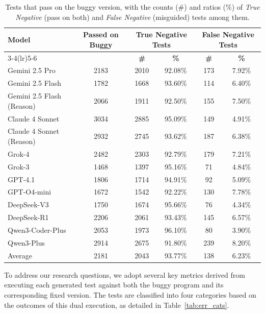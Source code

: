 \documentclass[acmsmall]{acmart}
\begin{document}
\begin{table}[ht]
\vspace{-0.4em}
\centering
\scriptsize
\caption{Tests that pass on the buggy version, with the counts (\#) and ratios (\%) of \emph{True Negative} (pass on both) and \emph{False Negative} (misguided) tests among them.}
\vspace{-0.4em}
\label{tab:flaw_demo}
\begin{tabular}{l|c|cc|cc}
\toprule
\multirow{3}{*}{\textbf{Model}} & \multirow{2}{*}{\textbf{Passed on Buggy}} & \multicolumn{2}{c|}{\textbf{True Negative Tests}} & \multicolumn{2}{c}{\textbf{False Negative Tests}} \\
\cmidrule(lr){3-4}\cmidrule(lr){5-6}
 &  & \textbf{\#} & \textbf{\%} & \textbf{\#} & \textbf{\%} \\
\midrule
Gemini 2.5 Pro & 2183 & 2010 & 92.08\% & 173 & 7.92\% \\
Gemini 2.5 Flash & 1782 & 1668 & 93.60\% & 114 & 6.40\% \\
Gemini 2.5 Flash (Reason) & 2066 & 1911 & 92.50\% & 155 & 7.50\% \\
Claude 4 Sonnet & 3034 & 2885 & 95.09\% & 149 & 4.91\% \\
Claude 4 Sonnet (Reason) & 2932 & 2745 & 93.62\% & 187 & 6.38\% \\
Grok-4  & 2482 & 2303 & 92.79\% & 179 & 7.21\% \\
Grok-3 & 1468 & 1397 & 95.16\% & 71 & 4.84\% \\
GPT-4.1 & 1806 & 1714 & 94.91\% & 92 & 5.09\% \\
GPT-O4-mini & 1672 & 1542 & 92.22\% & 130 & 7.78\% \\
DeepSeek-V3 & 1750 & 1674 & 95.66\% & 76 & 4.34\% \\
DeepSeek-R1 & 2206 & 2061 & 93.43\% & 145 & 6.57\% \\
Qwen3-Coder-Plus & 2053 & 1973 & 96.10\% & 80 & 3.90\% \\
Qwen3-Plus & 2914 & 2675 & 91.80\% & 239 & 8.20\% \\
\midrule
Average & 2181 & 2043 & 93.77\% & 138 & 6.23\% \\
\bottomrule
\end{tabular}
\vspace{-1.8em}
\end{table}

To address our research questions, we adopt several key metrics derived from executing each generated test against both the buggy program and its corresponding fixed version. The tests are classified into four categories based on the outcomes of this dual execution, as detailed in Table~\ref{tab:err_cats}.
\end{document}
